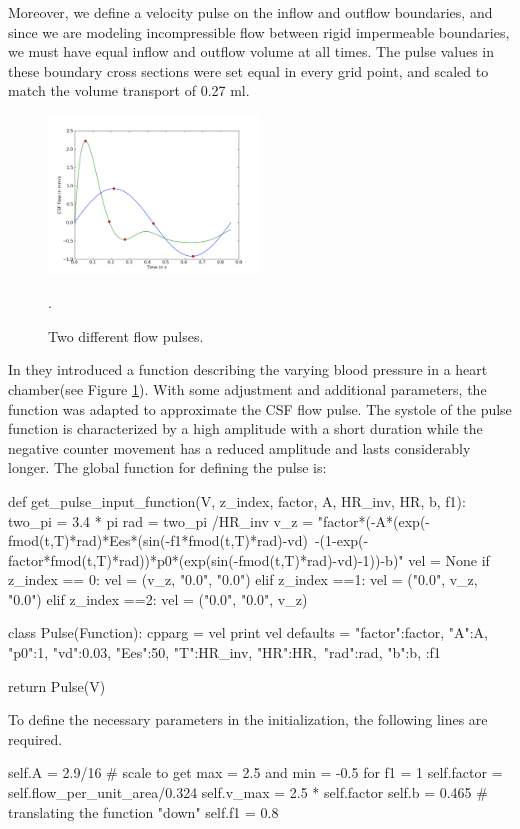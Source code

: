 Moreover, we define a velocity pulse on the inflow and outflow
boundaries, and since we are modeling incompressible flow between rigid
impermeable boundaries, we must have equal inflow and outflow volume
at all times. The pulse values in these boundary cross sections were
set equal in every grid point, and scaled to match the volume
transport of 0.27 ml.

\begin{figure}\begin{center}
\includegraphics[width = 0.5\textwidth]{chapters/hentschel/pdf/sin_pulse.pdf}
\caption{Two different flow pulses.}
\label{fig:sin_pulse}.
\end{center}\end{figure}

In \cite{SmithChase2ShawEtAl2006} they introduced a function describing the varying blood pressure in a heart chamber(see Figure \ref{fig:sin_pulse}). With some adjustment and additional parameters, the function was adapted to approximate the CSF flow pulse. The systole of the pulse function is characterized by a high amplitude with a short duration while the negative counter movement has a reduced amplitude and lasts considerably longer.
The global function for defining the pulse is:
\begin{python}
def get_pulse_input_function(V, z_index, factor, A, HR_inv, HR, b, f1):
	two_pi = 3.4 * pi
	rad = two_pi /HR_inv
	v_z = "factor*(-A*(exp(-fmod(t,T)*rad)*Ees*(sin(-f1*fmod(t,T)*rad)-vd)\
          -(1-exp(-factor*fmod(t,T)*rad))*p0*(exp(sin(-fmod(t,T)*rad)-vd)-1))-b)"
	vel = None
	if z_index == 0:
		vel = (v_z, "0.0", "0.0")
	elif z_index ==1:
		vel = ("0.0", v_z, "0.0")
	elif z_index ==2:
		vel = ("0.0", "0.0", v_z)

	class Pulse(Function):
		cpparg = vel
		print vel
		defaults = {"factor":factor, "A":A, "p0":1, "vd":0.03, "Ees":50, "T":HR_inv, "HR":HR,\
                     "rad":rad, "b":b, :f1}

	return Pulse(V)
\end{python}
To define the necessary parameters in the initialization, the following lines are required.
\begin{python}
self.A = 2.9/16	# scale to get max = 2.5 and min = -0.5 for f1 = 1
self.factor = self.flow_per_unit_area/0.324
self.v_max = 2.5 * self.factor
self.b = 0.465 	# translating the function "down"
self.f1 = 0.8
\end{python}

